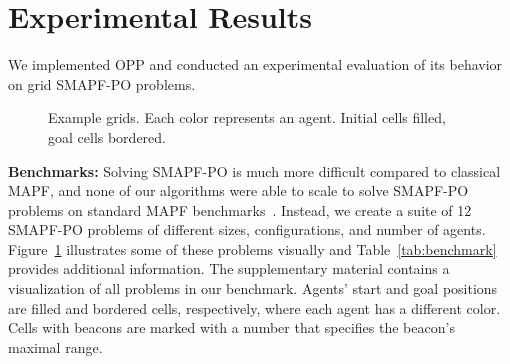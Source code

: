 \documentclass[letterpaper]{article} %
\begin{document}
\section{Experimental Results}
We implemented OPP  and conducted an experimental evaluation of its behavior on grid SMAPF-PO problems.
\begin{figure}[t]
\centering
     \caption{Example grids. Each color represents an agent. Initial cells filled, goal cells bordered.}
     \label{fig:multi-problems}
\end{figure}
\noindent\textbf{Benchmarks:}
Solving SMAPF-PO is much more difficult compared to classical MAPF, and none of our algorithms were able to scale to solve SMAPF-PO problems on standard MAPF benchmarks~\cite{stern2019mapf}.
Instead, we create a suite of 12 SMAPF-PO problems of different sizes, configurations, and number of agents.
Figure~\ref{fig:multi-problems} illustrates some of these problems visually and Table~\ref{tab:benchmark} provides additional information.
The supplementary material contains a visualization of all problems in our benchmark.
Agents' start and goal positions are filled and bordered cells, respectively, where each agent has a different color. Cells with beacons are marked with a number that specifies the beacon's maximal range.
\end{document}
